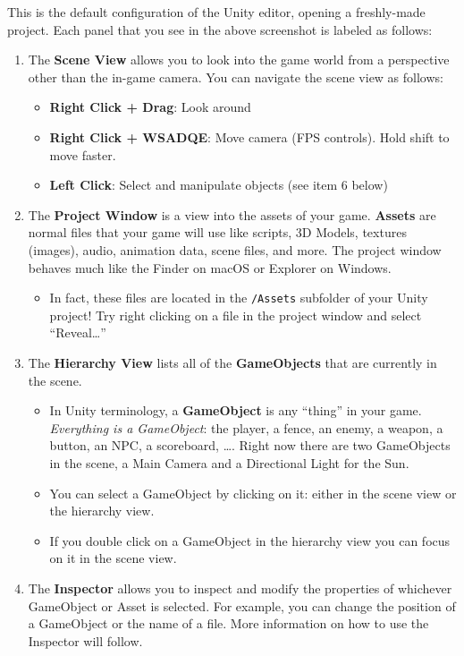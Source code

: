 \documentclass[11pt]{article}
\begin{document}
This is the default configuration of the Unity editor, opening a freshly-made project.  Each panel that you see in the above screenshot is labeled as follows:

\begin{enumerate}
    \item The \textbf{Scene View} allows you to look into the game world from a perspective other than the in-game camera.  You can navigate the scene view as follows:
    \begin{itemize}
        \item \textbf{Right Click + Drag}: Look around
        \item \textbf{Right Click + WSADQE}: Move camera (FPS controls).  Hold shift to move faster.
        \item \textbf{Left Click}: Select and manipulate objects (see item 6 below)
    \end{itemize}
    \item The \textbf{Project Window} is a view into the assets of your game.  \textbf{Assets} are normal files that your game will use like scripts, 3D Models, textures (images), audio, animation data, scene files, and more.  The project window behaves much like the Finder on macOS or Explorer on Windows.
    \begin{itemize}
        \item In fact, these files are located in the \lstinline!/Assets! subfolder of your Unity project!  Try right clicking on a file in the project window and select ``Reveal\dots''
    \end{itemize}
    \item The \textbf{Hierarchy View} lists all of the \textbf{GameObjects} that are currently in the scene.
    \begin{itemize}
        \item In Unity terminology, a \textbf{GameObject} is any ``thing'' in your game.  \textit{Everything is a GameObject}: the player, a fence, an enemy, a weapon, a button, an NPC, a scoreboard, \dots.  Right now there are two GameObjects in the scene, a Main Camera and a Directional Light for the Sun.
        \item You can select a GameObject by clicking on it: either in the scene view or the hierarchy view.
        \item If you double click on a GameObject in the hierarchy view you can focus on it in the scene view.
    \end{itemize}
    \item The \textbf{Inspector} allows you to inspect and modify the properties of whichever GameObject or Asset is selected.  For example, you can change the position of a GameObject or the name of a file.  More information on how to use the Inspector will follow.

\end{enumerate}
\end{document}

